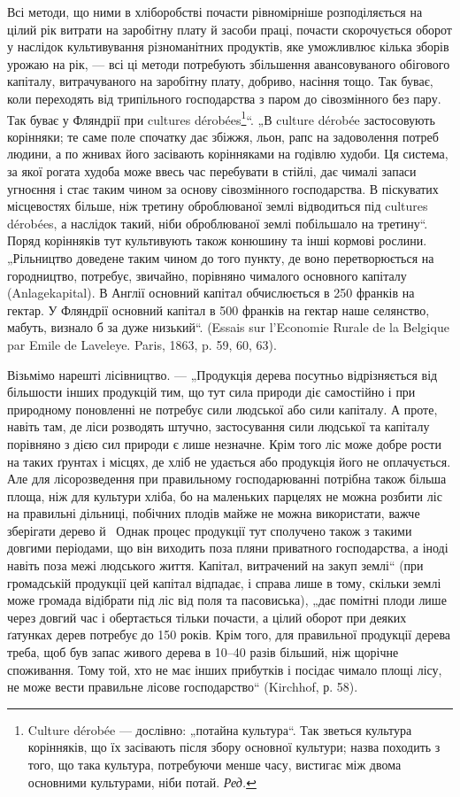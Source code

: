 Всі методи, що ними в хліборобстві почасти рівномірніше розподіляється на цілий рік витрати на
заробітну плату й засоби праці, почасти скорочується оборот у наслідок культивування різноманітних
продуктів, яке уможливлює кілька зборів урожаю на рік, — всі ці методи потребують збільшення
авансовуваного обігового капіталу, витрачуваного на заробітну плату, добриво, насіння тощо. Так
буває, коли переходять від трипільного господарства з паром до сівозмінного без пару. Так буває у
Фляндрії при cultures dérobées\footnote*{
Culture dérobée — дослівно: „потайна культура“. Так зветься культура корінняків, що їх засівають
після збору основної культури; назва походить з того, що така культура, потребуючи менше часу,
вистигає між двома основними культурами, ніби потай. \emph{Ред.}
}“. „В culture dérobée застосовують корінняки; те саме поле спочатку
дає збіжжя, льон, рапс на задоволення потреб людини,
а по жнивах його засівають корінняками на годівлю худоби. Ця система, за якої рогата худоба
може ввесь час перебувати в стійлі, дає чималі запаси угноєння і стає таким чином за основу
сівозмінного господарства. В піскуватих місцевостях більше, ніж третину оброблюваної землі
відводиться під cultures dérobées, а наслідок такий, ніби оброблюваної землі побільшало на третину“.
Поряд корінняків тут культивують також конюшину та інші кормові рослини. „Рільництво доведене таким
чином до того пункту, де воно перетворюється на городництво, потребує, звичайно, порівняно чималого
основного капіталу (Anlagekapital). В Англії основний капітал обчислюється в 250 франків на гектар.
У Фляндрії основний капітал в 500 франків на гектар наше селянство, мабуть, визнало б за дуже
низький“. (Essais sur l’Economie Rurale de la Belgique par Emile de Laveleye. Paris, 1863, p. 59,
60, 63).

Візьмімо нарешті лісівництво. — „Продукція дерева посутньо відрізняється від більшости інших
продукцій тим, що тут сила природи діє самостійно і при природному поновленні не потребує сили
людської або сили капіталу. А проте, навіть там, де ліси розводять штучно, застосування сили
людської та капіталу порівняно з дією сил природи є лише незначне. Крім того ліс може добре рости на
таких ґрунтах і місцях, де хліб не удається або продукція його не оплачується. Але для
лісорозведення при правильному господарюванні потрібна також більша площа, ніж для культури хліба,
бо на маленьких парцелях не можна розбити ліс на правильні дільниці, побічних плодів майже не можна
використати, важче зберігати дерево й~ Однак процес продукції тут сполучено також з такими
довгими періодами, що він виходить поза пляни приватного господарства, а іноді навіть поза межі
людського життя. Капітал, витрачений на закуп землі“ (при громадській продукції
цей капітал відпадає, і справа лише в тому,
скільки землі може громада відібрати під ліс від поля та пасовиська), „дає помітні плоди лише через
довгий час і обертається тільки почасти, а цілий оборот при деяких ґатунках дерев потребує до 150
років. Крім того, для правильної продукції дерева треба, щоб був запас живого дерева в 10--40 разів
більший, ніж щорічне споживання. Тому той, хто не має інших прибутків і посідає чимало площі лісу,
не може вести правильне лісове господарство“ (Kirchhof, р. 58).

